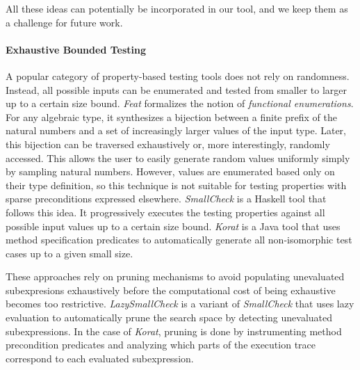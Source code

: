 \documentclass[sigconf, anonymous, review]{acmart}
\begin{document}
%
All these ideas can potentially be incorporated in our tool, and we keep them as
a challenge for future work.


\paragraph{Exhaustive Bounded Testing}

A popular category of property-based testing tools does not rely on randomness.
%
Instead, all possible inputs can be enumerated and tested from smaller to larger
up to a certain size bound.
%
%
%
\emph{Feat} \cite{DuregardJW12} formalizes the notion of \emph{functional
  enumerations}.
%
For any algebraic type, it synthesizes a bijection between a finite prefix of
the natural numbers and a set of increasingly larger values of the input type.
%
Later, this bijection can be traversed exhaustively or, more interestingly,
randomly accessed.
%
This allows the user to easily generate random values uniformly simply by
sampling natural numbers.
%
However, values are enumerated based only on their type definition, so this
technique is not suitable for testing properties with sparse preconditions
expressed elsewhere.
%
\emph{SmallCheck} \cite{runciman2008smallcheck} is a Haskell tool that follows
this idea.
%
It progressively executes the testing properties against all possible input
values up to a certain size bound.
%
\emph{Korat} \cite{boyapati2002korat} is a Java tool that uses method
specification predicates to automatically generate all non-isomorphic test cases
up to a given small size.


These approaches rely on pruning mechanisms to avoid populating unevaluated
subexpresions exhaustively before the computational cost of being exhaustive
becomes too restrictive.
%
\emph{LazySmallCheck} is a variant of \emph{SmallCheck} that uses lazy
evaluation to automatically prune the search space by detecting unevaluated
subexpressions.
%
In the case of \emph{Korat}, pruning is done by instrumenting method
precondition predicates and analyzing which parts of the execution trace
correspond to each evaluated subexpression.
\end{document}
